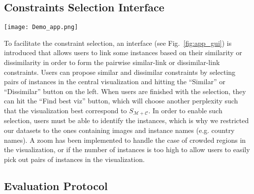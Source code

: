 \subsection{Constraints Selection Interface}\label{subsec:constraint_preparation}

\begin{figure*}
    \centering
    \texttt{[image: Demo\_app.png]}
    \caption{Interactive interface allowing users to select dissimilar links (red lines) between instances, as well as similar links (green lines). In order to draw these constraints, the user select two instances in the central visualization, and hit the button ``Similar'' or ``Dissimilar''. When the selection is finished, the user can click on the ``Find best viz'' button in order for the visualization to change according to the constraints. On the right, the constraint scores and the quality metrics scores are presented for all perplexity values in log scale.}\label{fig:app_gui}
\end{figure*}

To facilitate the constraint selection, an interface (see Fig.~\ref{fig:app_gui}) is introduced that allows users to link some instances based on their similarity or dissimilarity in order to form the pairwise similar-link or dissimilar-link constraints. Users can propose similar and dissimilar constraints by selecting pairs of instances in the central visualization and hitting the ``Similar'' or ``Dissimilar'' button on the left. When users are finished with the selection, they can hit the ``Find best viz'' button, which will choose another perplexity such that the visualization best correspond to $S_{\mathcal{M}+\mathcal{C}}$. In order to enable such selection, users must be able to identify the instances, which is why we restricted our datasets to the ones containing images and instance names (e.g. country names). A zoom has been implemented to handle the case of crowded regions in the visualization, or if the number of instances is too high to allow users to easily pick out pairs of instances in the visualization.

\subsection{Evaluation Protocol}\label{subsec:protocol}

